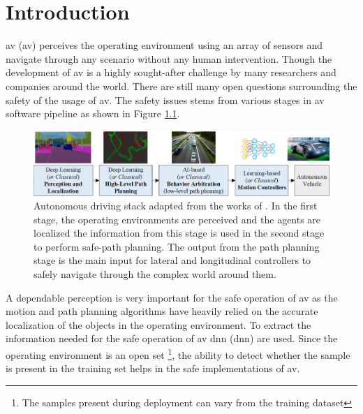 


    \chapter{Introduction}
    \justifying
    \acrlong{av} (\acrshort{av}) perceives the operating environment using an array of sensors and navigate through any scenario without any human intervention. Though the development of \acrshort{av} is a highly sought-after challenge by many researchers and companies around the world. There are still many open questions surrounding the safety of the usage of \acrshort{av}. The safety issues stems from various stages in \acrshort{av} software pipeline as shown in Figure \ref{fig:ac_stack}.
    
    \begin{figure}[H]
        \centering
        \includegraphics[scale=0.8]{images/Autonomous Driving stack.PNG}
        \caption[Autonomous Driving Stack]{Autonomous driving stack adapted from the works of \citet[pg.4]{Grigorescu2020}. In the first stage, the operating environments are perceived and the agents are localized the information from this stage is used in the second stage to perform safe-path planning. The output from the path planning stage is the main input for lateral and longitudinal controllers to safely navigate through the complex world around them. }
        \label{fig:ac_stack}
    \end{figure}
    
    A dependable perception is very important for the safe operation of \acrshort{av} as the motion and path planning algorithms have heavily relied on the accurate localization of the objects in the operating environment. To extract the information needed for the safe operation of \acrshort{av} \acrlong{dnn} (\acrshort{dnn}) are used. Since the operating environment is an open set \footnote{The samples present during deployment can vary from the training dataset}, the ability to detect whether the sample is present in the training set helps in the safe implementations of \acrshort{av}.
    
